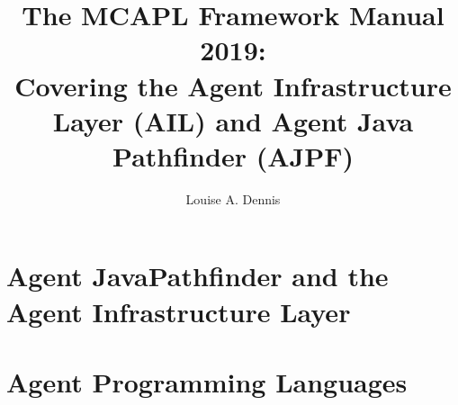 \documentclass[a4]{book}
\author{Louise A. Dennis}
\title{The MCAPL Framework Manual 2019: \\
Covering the Agent Infrastructure Layer (AIL) and Agent Java Pathfinder (AJPF)}
\begin{document}
\maketitle

\tableofcontents

\SetJava






\part{Agent JavaPathfinder and the Agent Infrastructure Layer}







\part{Agent Programming Languages}













\printindex
\end{document}
